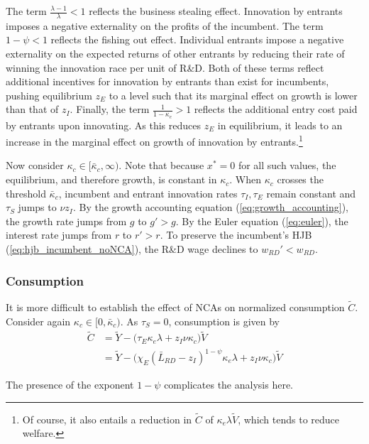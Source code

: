 \documentclass[11pt,english]{article}
\theoremstyle{remark}
\begin{document}
The term $\frac{\lambda - 1}{\lambda} < 1$ reflects the business stealing effect. Innovation by entrants imposes a negative externality on the profits of the incumbent. The term $1-\psi < 1$ reflects the fishing out effect. Individual entrants impose a negative externality on the expected returns of other entrants by reducing their rate of winning the innovation race per unit of R\&D. Both of these terms reflect additional incentives for innovation by entrants than exist for incumbents, pushing equilibrium $z_E$ to a level such that its marginal effect on growth is lower than that of $z_I$. Finally, the term $\frac{1}{1-\kappa_e} > 1$ reflects the additional entry cost paid by entrants upon innovating. As this reduces $z_E$ in equilibrium, it leads to an increase in the marginal effect on growth of innovation by entrants.\footnote{Of course, it also entails a reduction in $\tilde{C}$ of $\kappa_e \lambda \tilde{V}$, which tends to reduce welfare.}

Now consider $\kappa_c \in [\bar{\kappa}_c,\infty)$. Note that because $x^* = 0$ for all such values, the equilibrium, and therefore growth, is constant in $\kappa_c$. When $\kappa_c$ crosses the threshold $\bar{\kappa}_c$, incumbent and entrant innovation rates $\tau_I,\tau_E$ remain constant and $\tau_S$ jumps to $\nu z_I$. By the growth accounting equation (\ref{eq:growth_accounting}), the growth rate jumps from $g$ to $g' > g$. By the Euler equation (\ref{eq:euler}), the interest rate jumps from $r$ to $r'>r$. To preserve the incumbent's HJB (\ref{eq:hjb_incumbent_noNCA}), the R\&D wage declines to $w_{RD}' < w_{RD}$.


\subsubsection{Consumption}\label{cs:consumption1}

It is more difficult to establish the effect of NCAs on normalized consumption $\tilde{C}$. Consider again $\kappa_c \in [0, \bar{\kappa}_c)$. As $\tau_S = 0$, consumption is given by 
\begin{align}
\tilde{C} &= \tilde{Y} - \Big( \tau_E  \kappa_e \lambda + z_I \nu \kappa_c \Big) \tilde{V} \\
&= \tilde{Y} - \Big( \chi_E (\bar{L}_{RD} - z_I)^{1-\psi} \kappa_e \lambda + z_I \nu \kappa_c \Big) \tilde{V} \label{cs:consumption_eq}
\end{align}

The presence of the exponent $1-\psi$ complicates the analysis here. 
\end{document}
